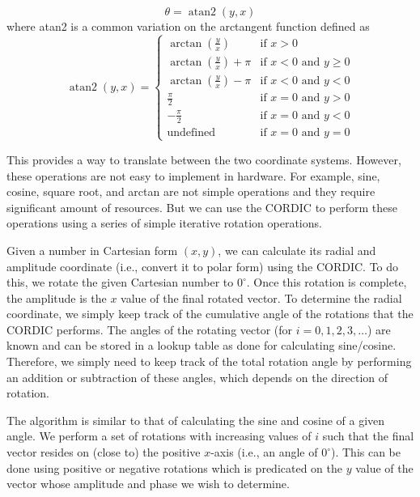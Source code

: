 \begin{equation}
\theta = \operatorname{atan2}(y, x)
\end{equation}
where atan2 is a common variation on the arctangent function defined as
\begin{equation}
\operatorname{atan2}(y, x) =
\begin{cases}
\arctan(\frac{y}{x}) & \mbox{if } x > 0\\
\arctan(\frac{y}{x}) + \pi & \mbox{if } x < 0 \mbox{ and } y \ge 0\\
\arctan(\frac{y}{x}) - \pi & \mbox{if } x < 0 \mbox{ and } y < 0\\
\frac{\pi}{2} & \mbox{if } x = 0 \mbox{ and } y > 0\\
-\frac{\pi}{2} & \mbox{if } x = 0 \mbox{ and } y < 0\\
\text{undefined} & \mbox{if } x = 0 \mbox{ and } y = 0
\end{cases}
\end{equation}

This provides a way to translate between the two coordinate systems. However, these operations are not easy to implement in hardware. For example, sine, cosine, square root, and arctan are not simple operations and they require significant amount of resources. But we can use the CORDIC to perform these operations using a series of simple iterative rotation operations. 

Given a number in Cartesian form $(x,y)$, we can calculate its radial and amplitude coordinate (i.e., convert it to polar form) using the CORDIC. To do this, we rotate the given Cartesian number to $0^{\circ}$. Once this rotation is complete, the amplitude is the $x$ value of the final rotated vector. To determine the radial coordinate, we simply keep track of the cumulative angle of the rotations that the CORDIC performs. The angles of the rotating vector (for $i = 0,1,2,3, \dots$) are known and can be stored in a lookup table as done for calculating sine/cosine. Therefore, we simply need to keep track of the total rotation angle by performing an addition or subtraction of these angles, which depends on the direction of rotation.

The algorithm is similar to that of calculating the sine and cosine of a given angle. We perform a set of rotations with increasing values of $i$ such that the final vector resides on (close to) the positive $x$-axis (i.e., an angle of $0^{\circ}$). This can be done using positive or negative rotations  which is predicated on the $y$ value of the vector whose amplitude and phase we wish to determine. 

